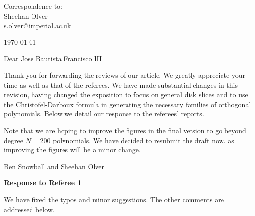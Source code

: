 \documentclass[10pt]{letter}
\begin{document}
\thispagestyle{empty}

\hfill
\begin{flushright}
Correspondence to: \\
Sheehan Olver \\
s.olver@imperial.ac.uk \\
\end{flushright}

\vspace{1em}
\hfill\today

Dear Jose Bautista Francisco III

Thank you for forwarding the reviews of our article. We greatly appreciate your time as well as that of the referees.  We have made substantial changes in this revision, having changed the exposition to focus on general disk slices and to use the Christofel-Darboux formula in generating the necessary families of orthogonal polynomials. Below we detail our response to the referees' reports. 

Note that we are  hoping to improve the figures in the final version to go beyond degree $N = 200$ polynomials. We have decided to resubmit the draft now, as improving the figures will be a minor change.

Ben Snowball and Sheehan Olver

\bigskip 

\centerline{\textbf{Response to Referee 1}}

We have fixed the typos and minor suggestions. The other comments are addressed below.
\end{document}
